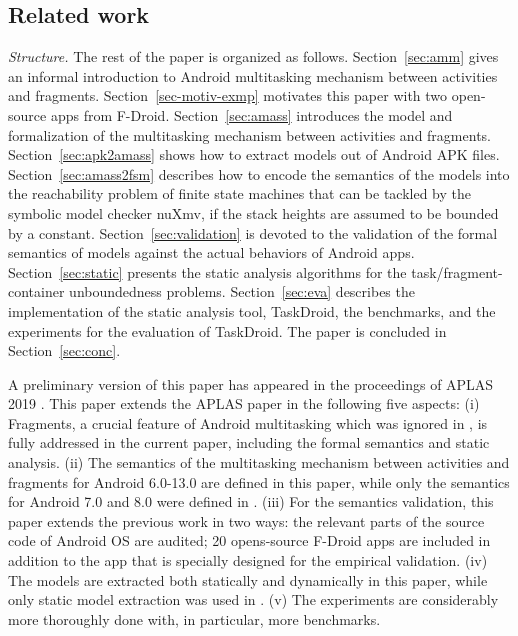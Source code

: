 
\subsection{Related work}\label{sec:related}

\medskip
 
\noindent\emph{Structure.} The rest of the paper is organized as follows. 
Section~\ref{sec:amm} gives an informal introduction to Android multitasking mechanism between activities and fragments. 
Section~\ref{sec-motiv-exmp} motivates this paper with two open-source apps from F-Droid. 
Section~\ref{sec:amass} introduces the {\AMASS} model and formalization of the multitasking mechanism  between activities and fragments. Section~\ref{sec:apk2amass} shows how to extract {\AMASS} models out of Android APK files. Section~\ref{sec:amass2fsm} describes how to encode the semantics of the {\AMASS} models into the reachability problem of finite state machines  that can be tackled by the symbolic model checker nuXmv, if the stack heights are assumed to be bounded by a constant. Section~\ref{sec:validation} is devoted to the validation of the formal semantics of {\AMASS} models against the actual behaviors of Android apps. 
Section~\ref{sec:static} presents the static analysis algorithms for the task/fragment-container unboundedness problems. 
Section~\ref{sec:eva} describes the implementation of the static analysis tool, TaskDroid, the benchmarks, and the experiments for the evaluation of TaskDroid. %
The paper is concluded in Section~\ref{sec:conc}. 

\medskip

A preliminary version of this paper has appeared in the proceedings of APLAS 2019 \cite{HCWWY19}. This paper extends the APLAS paper in the following five aspects: (i) Fragments, a crucial feature of Android multitasking which was ignored in \cite{HCWWY19}, is fully addressed in the current paper, including the formal semantics and static analysis. (ii) The semantics of the multitasking mechanism between activities and fragments for Android 6.0-13.0 are defined in this paper, while only the semantics for Android 7.0 and 8.0 were defined in \cite{HCWWY19}. (iii) %
For the semantics validation, this paper extends the previous work in two ways: the relevant parts of the source code of Android OS are audited; 20 opens-source F-Droid apps are included in addition to the app that is specially designed for the empirical validation. (iv) The models are extracted both statically and dynamically in this paper, while only static model extraction was used in \cite{HCWWY19}. (v) The experiments are considerably more thoroughly done with, in particular, more benchmarks.
 
